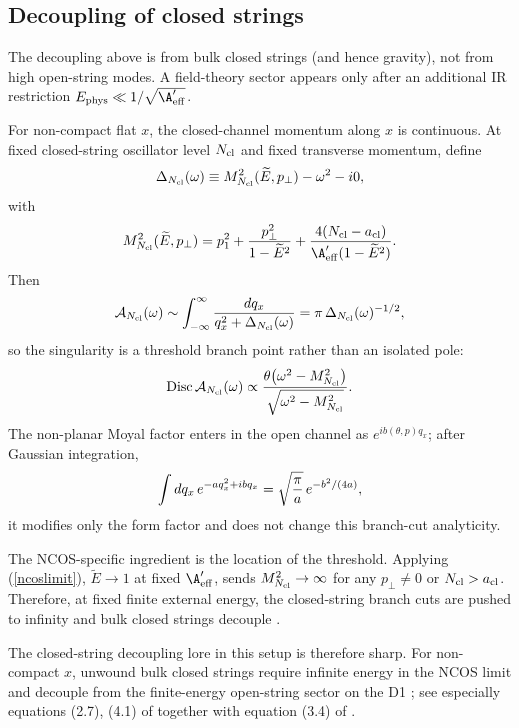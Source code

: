 \documentclass[12pt]{article}
\begin{document}
\subsection{Decoupling of closed strings}

The decoupling above is from bulk closed strings (and hence gravity), not from high open-string modes. A field-theory sector appears only after an additional IR restriction $E_{\rm phys}\ll 1/\sqrt{\A'_{\rm eff}}$.

For non-compact flat $x$, the closed-channel momentum along $x$ is continuous. At fixed closed-string oscillator level $N_{\rm cl}$ and fixed transverse momentum, define
\[
\Delta_{N_{\rm cl}}(\omega)\equiv M_{N_{\rm cl}}^2(\widetilde E,p_\perp)-\omega^2-i0,
\]
with
\[
M_{N_{\rm cl}}^2(\widetilde E,p_\perp)
=p_1^2+{p_\perp^2\over 1-\widetilde E^2}
 +{4(N_{\rm cl}-a_{\rm cl})\over \A'_{\rm eff}(1-\widetilde E^2)}.
\]
Then
\[
\mathcal A_{N_{\rm cl}}(\omega)\sim
\int_{-\infty}^{\infty}{dq_x\over q_x^2+\Delta_{N_{\rm cl}}(\omega)}
=\pi\,\Delta_{N_{\rm cl}}(\omega)^{-1/2},
\]
so the singularity is a threshold branch point rather than an isolated pole:
\[
{\rm Disc}\,\mathcal A_{N_{\rm cl}}(\omega)\propto
{\theta\!\left(\omega^2-M_{N_{\rm cl}}^2\right)\over
\sqrt{\omega^2-M_{N_{\rm cl}}^2}}.
\]
The non-planar Moyal factor enters in the open channel as $e^{ib(\theta,p)q_x}$; after Gaussian integration,
\[
\int dq_x\,e^{-a q_x^2+ibq_x}=\sqrt{\pi\over a}\,e^{-b^2/(4a)},
\]
it modifies only the form factor and does not change this branch-cut analyticity.

The NCOS-specific ingredient is the location of the threshold. Applying (\ref{ncoslimit}), $\widetilde E\to1$ at fixed $\A'_{\rm eff}$, sends $M_{N_{\rm cl}}^2\to\infty$ for any $p_\perp\neq0$ or $N_{\rm cl}>a_{\rm cl}$. Therefore, at fixed finite external energy, the closed-string branch cuts are pushed to infinity and bulk closed strings decouple \cite{seiberg2000stringsbackgroundelectricfield,bassetto2003oneloopunitaritystringtheories}.

The closed-string decoupling lore in this setup is therefore sharp. For non-compact $x$, unwound bulk closed strings require infinite energy in the NCOS limit and decouple from the finite-energy open-string sector on the D1 \cite{seiberg2000stringsbackgroundelectricfield,gopakumar2000sdualitynoncommutativegaugetheory}; see especially equations (2.7), (4.1) of \cite{seiberg2000stringsbackgroundelectricfield} together with equation (3.4) of \cite{gopakumar2000sdualitynoncommutativegaugetheory}.
\end{document}

